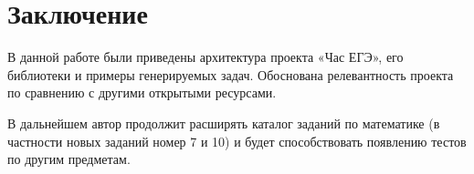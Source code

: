 \section*{Заключение}
В данной работе были приведены архитектура проекта «Час ЕГЭ», его библиотеки
и примеры генерируемых задач. Обоснована релевантность проекта по сравнению
с другими открытыми ресурсами.

В дальнейшем автор продолжит расширять каталог
заданий по математике (в частности новых заданий номер 7 и 10) и будет способствовать появлению тестов по другим предметам.

